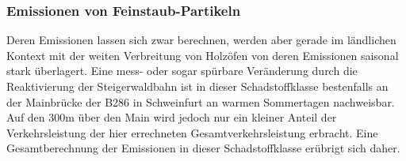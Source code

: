 \documentclass[fontsize=12pt,a4paper]{scrreprt}
\begin{document}
\subsubsection{Emissionen von Feinstaub-Partikeln}

Deren Emissionen lassen sich zwar berechnen, werden aber gerade im ländlichen Kontext mit der weiten Verbreitung von Holzöfen von deren Emissionen saisonal stark überlagert. Eine mess- oder sogar spürbare Veränderung durch die Reaktivierung der Steigerwaldbahn ist in dieser Schadstoffklasse bestenfalls an der Mainbrücke der B286 in Schweinfurt an warmen Sommertagen nachweisbar. Auf den 300m über den Main wird jedoch nur ein kleiner Anteil der Verkehrsleistung der hier errechneten Gesamtverkehrsleistung erbracht. Eine Gesamtberechnung der Emissionen in dieser Schadstoffklasse erübrigt sich daher.
\end{document}
